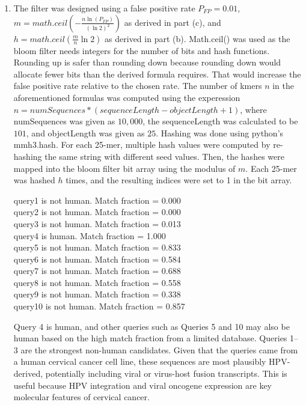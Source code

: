 \documentclass{article}
\begin{document}
\begin{enumerate}[label=\alph*)]
    \item
    The filter was designed using a false positive rate $P_{FP}=0.01$, $m = math.ceil(-\frac{n\ln(P_{FP})}{(\ln2)^2})$ as derived in part (c), and $h = math.ceil(\frac{m}{n}\ln 2)$ as derived in part (b). Math.ceil() was used as the bloom filter needs integers for the number of bits and hash functions. Rounding up is safer than rounding down because rounding down would allocate fewer bits than the derived formula requires. That would increase the false positive rate relative to the chosen rate. The number of kmers $n$ in the aforementioned formulas was computed using the experession $n = numSequences *(sequenceLength-objectLength+1)$, where numSequences was given as $10,000$, the sequenceLength was calculated to be $101$, and objectLength was given as $25$. Hashing was done using python's mmh3.hash. For each 25-mer, multiple hash values were computed by re-hashing the same string with different seed values. Then, the hashes were mapped into the bloom filter bit array using the modulus of $m$. Each 25-mer was hashed $h$ times, and the resulting indices were set to 1 in the bit array.
    \begin{center}
        query1 is not human. Match fraction = 0.000\\
        query2 is not human. Match fraction = 0.000\\
        query3 is not human. Match fraction = 0.013\\
        query4 is human. Match fraction = 1.000\\
        query5 is not human. Match fraction = 0.833\\
        query6 is not human. Match fraction = 0.584\\
        query7 is not human. Match fraction = 0.688\\
        query8 is not human. Match fraction = 0.558\\
        query9 is not human. Match fraction = 0.338\\
        query10 is not human. Match fraction = 0.857\\
    \end{center}
    Query 4 is human, and other queries such as Queries 5 and 10 may also be human based on the high match fraction from a limited database. Queries 1–3 are the strongest non-human candidates. Given that the queries came from a human cervical cancer cell line, these sequences are most plausibly HPV-derived, potentially including viral or virus-host fusion transcripts. This is useful because HPV integration and viral oncogene expression are key molecular features of cervical cancer.
    
\end{enumerate}
\end{document}
